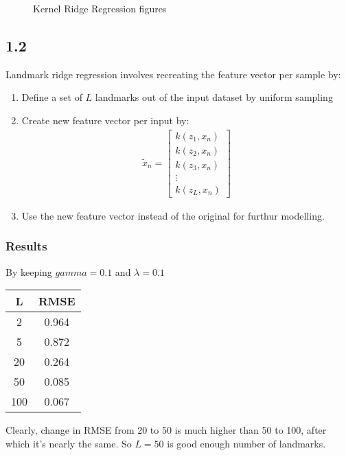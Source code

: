 \documentclass[a4paper,11pt]{article}
\begin{document}
\begin{mlsolution}
\begin{figure}[H]
    
    \caption{Kernel Ridge Regression figures}
    \label{fig:part5.1.1}
\end{figure}

\subsection*{1.2}
Landmark ridge regression involves recreating the feature vector per sample by:
\begin{enumerate}[noitemsep]
    \item Define a set of $L$ landmarks out of the input dataset by uniform sampling
    \item Create new feature vector per input by:
    \begin{align*}
        \tilde{x}_n = \begin{bmatrix}
            k(z_1, x_n) \\
            k(z_2, x_n) \\
            k(z_3, x_n) \\
            \vdots \\
            k(z_L, x_n)
        \end{bmatrix}
    \end{align*}
    \item Use the new feature vector instead of the original for furthur modelling.
\end{enumerate}

\subsubsection*{Results}
By keeping $gamma = 0.1$ and $\lambda = 0.1$
\begin{center}
    \begin{tabular}[pos]{|c|c|}
        \hline
        L & RMSE \\
        \hline
        2   & 0.964 \\
        5   & 0.872 \\
        20  & 0.264 \\
        50  & 0.085 \\
        100 & 0.067 \\
        \hline
    \end{tabular}
\end{center}
Clearly, change in RMSE from 20 to 50 is much higher than 50 to 100, after which it's nearly the same. So $L=50$ is good enough number of landmarks.


\end{mlsolution}
\end{document}
